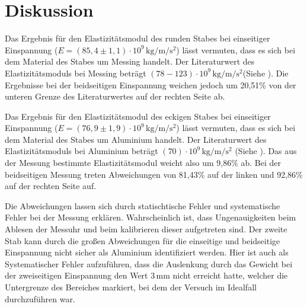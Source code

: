 \section{Diskussion}
\label{sec:Diskussion}


Das Ergebnis für den Elastizitätsmodul des runden
Stabes bei einseitiger Einspannung ($E=(85,4 \pm 1,1) \cdot 10^{9} \,\si{\kilo\gram\per\meter\per\second\squared}$)
lässt vermuten, dass es sich bei dem Material des
Stabes um Messing handelt. Der Literaturwert 
des Elastizitätsmoduls bei Messing beträgt
$(78-123)\cdot 10^{9} \,\si{\kilo\gram\per\meter\per\second\squared}$(Siehe \cite{chemie}).
Die Ergebnisse bei der beidseitigen Einspannung weichen
jedoch um 20,51\% von der unteren Grenze des Literaturwertes
auf der rechten Seite ab.


Das Ergebnis für den Elastizitätsmodul des eckigen
Stabes bei einseitiger Einspannung ($E=(76,9 \pm 1,9) \cdot 10^{9} \,\si{\kilo\gram\per\meter\per\second\squared}$)
lässt vermuten, dass es sich bei dem Material des
Stabes um Aluminium handelt. Der Literaturwert 
des Elastizitätsmoduls bei Aluminium beträgt
$(70)\cdot 10^{9} \,\si{\kilo\gram\per\meter\per\second\squared}$ (Siehe \cite{chemie}).
Das aus der Messung bestimmte Elastizitätsmodul weicht also um 9,86\% ab.
Bei der beidseitigen Messung treten Abweichungen von 81,43\%
auf der linken und 92,86\% auf der rechten Seite auf.


Die Abweichungen lassen sich durch statischtische Fehler
und systematische Fehler bei der Messung erklären. 
Wahrscheinlich ist, dass Ungenauigkeiten beim Ablesen der Messuhr
und beim kalibrieren dieser aufgetreten sind.
Der zweite Stab kann durch die großen Abweichungen
für die einseitige und beidseitige Einspannung nicht sicher
als Aluminium identifiziert werden. Hier ist auch als Systematischer Fehler aufzuführen,
dass die Auslenkung durch das Gewicht bei der zweiseitigen Einspannung den Wert $3\,\si{\milli\meter}$
nicht erreicht hatte, welcher die Untergrenze des Bereiches markiert,
bei dem der Versuch im Idealfall durchzuführen war.